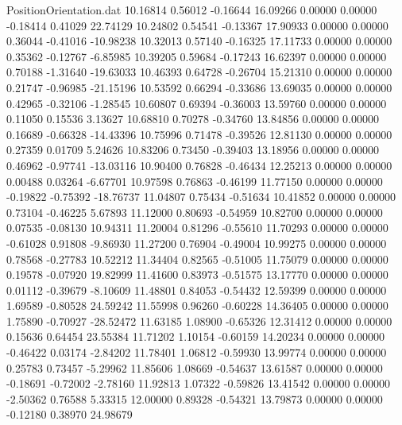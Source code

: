\begin{filecontents}{PositionOrientation.dat}
  10.16814    0.56012   -0.16644    16.09266    0.00000    0.00000   -0.18414    0.41029   22.74129
  10.24802    0.54541   -0.13367    17.90933    0.00000    0.00000    0.36044   -0.41016  -10.98238
  10.32013    0.57140   -0.16325    17.11733    0.00000    0.00000    0.35362   -0.12767   -6.85985
  10.39205    0.59684   -0.17243    16.62397    0.00000    0.00000    0.70188   -1.31640  -19.63033
  10.46393    0.64728   -0.26704    15.21310    0.00000    0.00000    0.21747   -0.96985  -21.15196
  10.53592    0.66294   -0.33686    13.69035    0.00000    0.00000    0.42965   -0.32106   -1.28545
  10.60807    0.69394   -0.36003    13.59760    0.00000    0.00000    0.11050    0.15536    3.13627
  10.68810    0.70278   -0.34760    13.84856    0.00000    0.00000    0.16689   -0.66328  -14.43396
  10.75996    0.71478   -0.39526    12.81130    0.00000    0.00000    0.27359    0.01709    5.24626
  10.83206    0.73450   -0.39403    13.18956    0.00000    0.00000    0.46962   -0.97741  -13.03116
  10.90400    0.76828   -0.46434    12.25213    0.00000    0.00000    0.00488    0.03264   -6.67701
  10.97598    0.76863   -0.46199    11.77150    0.00000    0.00000   -0.19822   -0.75392  -18.76737
  11.04807    0.75434   -0.51634    10.41852    0.00000    0.00000    0.73104   -0.46225    5.67893
  11.12000    0.80693   -0.54959    10.82700    0.00000    0.00000    0.07535   -0.08130   10.94311
  11.20004    0.81296   -0.55610    11.70293    0.00000    0.00000   -0.61028    0.91808   -9.86930
  11.27200    0.76904   -0.49004    10.99275    0.00000    0.00000    0.78568   -0.27783   10.52212
  11.34404    0.82565   -0.51005    11.75079    0.00000    0.00000    0.19578   -0.07920   19.82999
  11.41600    0.83973   -0.51575    13.17770    0.00000    0.00000    0.01112   -0.39679   -8.10609
  11.48801    0.84053   -0.54432    12.59399    0.00000    0.00000    1.69589   -0.80528   24.59242
  11.55998    0.96260   -0.60228    14.36405    0.00000    0.00000    1.75890   -0.70927  -28.52472
  11.63185    1.08900   -0.65326    12.31412    0.00000    0.00000    0.15636    0.64454   23.55384
  11.71202    1.10154   -0.60159    14.20234    0.00000    0.00000   -0.46422    0.03174   -2.84202
  11.78401    1.06812   -0.59930    13.99774    0.00000    0.00000    0.25783    0.73457   -5.29962
  11.85606    1.08669   -0.54637    13.61587    0.00000    0.00000   -0.18691   -0.72002   -2.78160
  11.92813    1.07322   -0.59826    13.41542    0.00000    0.00000   -2.50362    0.76588    5.33315
  12.00000    0.89328   -0.54321    13.79873    0.00000    0.00000   -0.12180    0.38970   24.98679

\end{filecontents}
